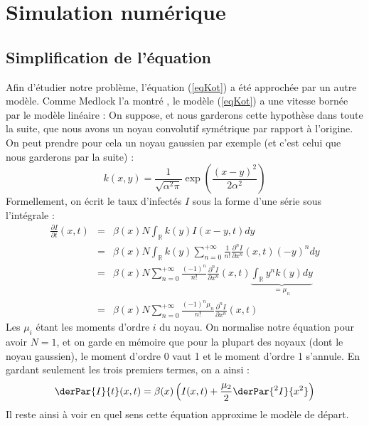 \documentclass{article}
\begin{document}
\section{Simulation numérique}
\subsection{Simplification de l'équation}
Afin d'étudier notre problème, l'équation (\ref{eqKot}) a été approchée par un autre modèle. Comme Medlock l'a montré \cite{KotMedlock03}, le modèle (\ref{eqKot}) a une vitesse bornée par le modèle linéaire :
On suppose, et nous garderons cette hypothèse dans toute la suite, que nous avons un noyau convolutif symétrique par rapport à l'origine. On peut prendre pour cela un noyau gaussien par exemple (et c'est celui que nous garderons par la suite) :
\[k(x,y)=\frac{1}{\sqrt{\alpha^2\pi}}\exp\left(\frac{(x-y)^2}{2\alpha^2}\right)\]
Formellement, on écrit le taux d'infectés $I$ sous la forme d'une série sous l'intégrale :
\begin{eqnarray*}
\frac{\partial I}{\partial t}(x,t) &=& \beta(x)N\int_{\mathbb{R}} k(y)I(x-y,t)dy\\
				&=&\beta(x)N\int_{\mathbb{R}} k(y)\sum_{n=0}^{+\infty} \frac{1}{n!} \frac{\partial^n I}{\partial x^n}(x,t)(-y)^n dy\\
				&=&\beta(x)N\sum_{n=0}^{+\infty} \frac{(-1)^n}{n!} \frac{\partial^n I}{\partial x^n}(x,t) \underbrace{\int_{\mathbb{R}} y^n k(y) dy}_{=\mu_n}\\
				&=&\beta(x)N\sum_{n=0}^{+\infty} \frac{(-1)^n\mu_n}{n!} \frac{\partial^n I}{\partial x^n}(x,t)
\end{eqnarray*}
Les $\mu_i$ étant les moments d'ordre $i$ du noyau. On normalise notre équation pour avoir $N=1$, et on garde en mémoire que pour la plupart des noyaux (dont le noyau gaussien), le moment d'ordre 0 vaut 1 et le moment d'ordre 1 s'annule. En gardant seulement les trois premiers termes, on a ainsi :
\begin{equation}\label{approx}
	\derPar{I}{t}(x,t)=\beta(x)\left(I(x,t)+\frac{\mu_2}{2}\derPar{{}^2I}{x^2}\right)
\end{equation}
Il reste ainsi à voir en quel sens cette équation approxime le modèle de départ.
\end{document}
